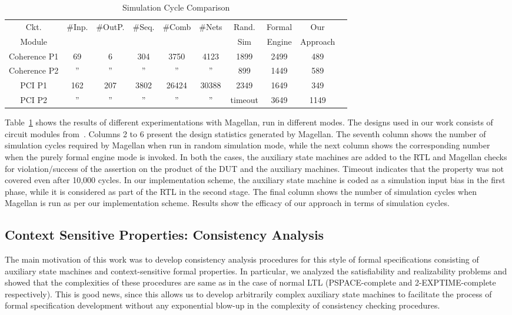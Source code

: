 \documentclass[a4paper, 11pt]{article}
\begin{document}
\begin{table}[htb]
\begin{center}
{\small
\begin{tabular}{|c|c|c|c|c|c|c|c|c|c|} \hline
Ckt. & \#Inp. & \#OutP. & \#Seq. & \#Comb & \#Nets & Rand. & Formal & Our \\
Module & & & & & & Sim & Engine & Approach \\ \hline \hline
Coherence P1 & 69 & 6 & 304 & 3750 & 4123 & 1899 & 2499 & 489 \\ \hline
Coherence P2 & '' & '' & '' & '' & '' & 899 & 1449 & 589 \\ \hline
PCI P1 & 162 & 207 & 3802 & 26424 & 30388 & 2349 & 1649 & 349\\ \hline
PCI P2 & '' & '' & '' & '' & '' & timeout & 3649 & 1149 \\ \hline
\end{tabular}
}
\end{center}
\caption{Simulation Cycle Comparison} \label{tab3}
\end{table}

Table~\ref{tab3} shows the results of different experimentations with
Magellan, run in different modes. The designs used in our work consists
of circuit modules from~\cite{open, texas}. 
Columns 2 to 6 present the design statistics
generated by Magellan. The seventh column
shows the number of simulation cycles required by Magellan when
run in random simulation mode, while the next column shows the
corresponding number when the purely formal engine mode is invoked.
In both the cases, the auxiliary state machines are added to
the RTL and Magellan checks
for violation/success of the assertion on the product of the DUT and the
auxiliary machines.
Timeout indicates that the property was not covered even after
10,000 cycles.
In our implementation scheme, the auxiliary state
machine is coded as a simulation input bias in the first phase, while
it is considered as part of the RTL in the second stage.
The final column shows the number of simulation cycles when Magellan is
run as per our implementation scheme.
Results show the efficacy of our approach in terms of simulation
cycles.

\subsection{Context Sensitive Properties: Consistency Analysis} \label{sec5.4}
The main motivation of this work was to develop consistency analysis 
procedures for this style of formal specifications consisting of auxiliary 
state machines and context-sensitive formal properties. In particular, 
we analyzed the satisfiability and realizability problems
and showed that the complexities of these procedures are 
same as in the case of normal LTL (PSPACE-complete and 2-EXPTIME-complete 
respectively). This is good news, since this allows
us to develop arbitrarily complex auxiliary state machines to facilitate 
the process of formal specification development without
any exponential blow-up in the complexity of consistency checking 
procedures.
\end{document}
